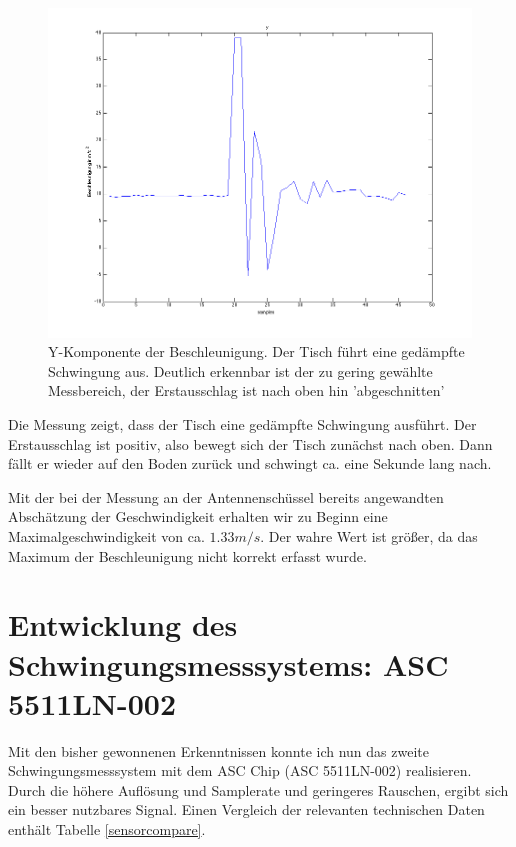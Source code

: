 \documentclass[12pt,a4paper]{scrartcl}
\begin{document}
\begin{figure}[H]
\centering
\includegraphics[scale=.4]{wakiki/tischmovement_y.png}
\caption{Y-Komponente der Beschleunigung. Der Tisch führt eine gedämpfte Schwingung aus. Deutlich erkennbar ist der zu gering gewählte Messbereich, der Erstausschlag ist nach oben hin 'abgeschnitten'}
\label{tischmovement_y}
\end{figure}

Die Messung zeigt, dass der Tisch eine gedämpfte Schwingung ausführt. Der Erstausschlag ist positiv, also bewegt sich der Tisch zunächst nach oben. Dann fällt er wieder auf den Boden zurück und schwingt ca.  eine Sekunde lang nach.

Mit der bei der Messung an der Antennenschüssel bereits angewandten Abschätzung der Geschwindigkeit erhalten wir zu Beginn eine Maximalgeschwindigkeit von ca. $1.33 m/s$. Der wahre Wert ist größer, da das Maximum der Beschleunigung nicht korrekt erfasst wurde. 



\newpage
\section{Entwicklung des Schwingungsmesssystems: ASC 5511LN-002}


Mit den bisher gewonnenen Erkenntnissen konnte ich nun das zweite Schwingungsmesssystem mit dem ASC Chip (ASC 5511LN-002) realisieren. Durch die höhere Auflösung und Samplerate und geringeres Rauschen, ergibt sich ein besser nutzbares Signal. Einen Vergleich der relevanten technischen Daten enthält Tabelle \ref{sensorcompare}.
\end{document}
